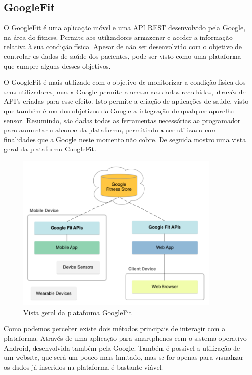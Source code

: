 \documentclass[11pt,twoside,a4paper]{report}
\begin{document}
\subsection{GoogleFit}

O GoogleFit é uma aplicação móvel e uma \gls{API} \gls{REST} desenvolvido pela Google, na área do fitness. Permite aos utilizadores armazenar e aceder a informação relativa à sua condição física. Apesar de não ser desenvolvido com o objetivo de controlar os dados de saúde dos pacientes, pode ser visto como uma plataforma que cumpre alguns desses objetivos.
\par 
O GoogleFit é mais utilizado com o objetivo de monitorizar a condição física dos seus utilizadores, mas a Google permite o acesso aos dados recolhidos, através de \gls{API}’s criadas para esse efeito. Isto permite a criação de aplicações de saúde, visto que também é um dos objetivos da Google a integração de qualquer aparelho sensor. Resumindo, são dadas todas as ferramentas necessárias ao programador para aumentar o alcance da plataforma, permitindo-a ser utilizada com finalidades que a Google neste momento não cobre. 
De seguida mostro uma vista geral da plataforma GoogleFit.

\begin{figure}[!ht]
  \centering
  \includegraphics[width=0.9\textwidth]{imgs/googleFitOverview.PNG}
  \caption[Vista geral da plataforma GoogleFit]{Vista geral da plataforma GoogleFit \cite{googlefit}}
  
  \label{f:googleFitOverview}
\end{figure}

Como podemos perceber existe dois métodos principais de interagir com a plataforma. Através de uma aplicação para smartphones com o sistema operativo Android, desenvolvida também pela Google.  Também é possível a utilização de um website, que será um pouco mais limitado, mas se for apenas para visualizar os dados já inseridos na plataforma é bastante viável.
\end{document}
